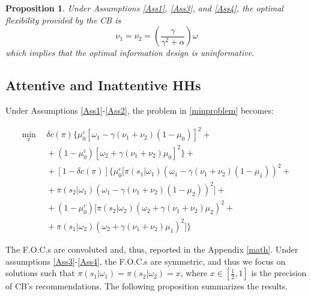 \documentclass[12pt,a4paper]{article}
\newtheorem{proposition}{Proposition}
\begin{document}
\begin{proposition}
    \label{Prop2}
    Under Assumptions \ref{Ass1}, \ref{Ass3}, and \ref{Ass4}, the optimal flexibility provided by the CB is
    \begin{equation}
        \nu_1=\nu_2=\left(\frac{\gamma}{\gamma^2+\alpha}\right)\omega
    \end{equation}
    which implies that the optimal information design is uninformative.
\end{proposition}

\subsection{Attentive and Inattentive HHs}

Under Assumptions \ref{Ass1}-\ref{Ass2}, the problem in \eqref{minproblem} becomes:

\begin{equation}
\begin{split}
    \min_{\pi} \ & \ \delta c(\pi)\Bigg\{\mu_0^c\left[\omega_1-\gamma(\nu_1+\nu_2)(1-\mu_0)\right]^2+\\
    \ & \ +(1-\mu_0^c)\left[\omega_2+\gamma(\nu_1+\nu_2)\mu_0\right]^2\Bigg\}+\\
    \ & \ +[1-\delta c(\pi)]\Bigg\{\mu_0^c\bigg[\pi(s_1|\omega_1)(\omega_1-\gamma (\nu_1+\nu_2) (1-\mu_1))^2+\\
    \ & \ +\pi(s_2|\omega_1)(\omega_1-\gamma (\nu_1+\nu_2) (1-\mu_2))^2\bigg]+ \\
    \ & \ +(1-\mu_0^c)\bigg[\pi(s_2|\omega_2)(\omega_2+\gamma (\nu_1+\nu_2) \mu_2)^2+\\
    \ & \ +\pi(s_1|\omega_2)(\omega_2+\gamma (\nu_1+\nu_2) \mu_1)^2 \bigg]\Bigg\}
    \end{split}
\end{equation}

The F.O.C.s are convoluted and, thus, reported in the Appendix \ref{math}.
Under assumptions \ref{Ass3}-\ref{Ass4}, the F.O.C.s are symmetric, and thus we focus on solutions such that $\pi(s_1|\omega_1)=\pi(s_2|\omega_2)=x$, where $x\in\left[\frac{1}{2},1\right]$ is the precision of CB's recommendations. The following proposition summarizes the results.
\end{document}
